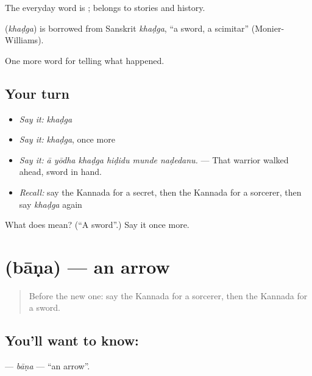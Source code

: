 The everyday word is ;  belongs to stories and history.

\begin{cousinweb}
\textbf{} (\emph{khaḍga}) is borrowed from Sanskrit \emph{khaḍga}, \textquotedblleft{}a sword, a scimitar\textquotedblright{} (Monier-Williams).
\end{cousinweb}

\begin{grammarlens}[title={What you've built}]
One more word for telling what happened.
\end{grammarlens}

\subsection*{Your turn}
\begin{itemize}
\raggedright
  \item \emph{Say it:} \emph{khaḍga}
  \item \emph{Say it:} \emph{khaḍga}, once more
  \item \emph{Say it:} \emph{ā yōdha khaḍga hiḍidu munde naḍedanu.} — That warrior walked ahead, sword in hand.
  \item \emph{Recall:} say the Kannada for a secret, then the Kannada for a sorcerer, then say \emph{khaḍga} again
\end{itemize}

\begin{tcolorbox}[breakable,colback=teal!4,colframe=teal!35!black,title={Before you move on}]
What does  mean? (\textquotedblleft{}A sword\textquotedblright{}.) Say it once more.
\end{tcolorbox}
\section[\texorpdfstring{\kn{ಬಾಣ} (bāṇa)}{ಬಾಣ (bāṇa)}]{ (bāṇa) — an arrow}

\label{lesson:KA-C349-bana}



\begin{quote}
Before the new one: say the Kannada for a sorcerer, then the Kannada for a sword.
\end{quote}

\subsection*{You'll want to know: }
\textbf{} — \emph{bāṇa} — \textquotedblleft{}an arrow\textquotedblright{}.

